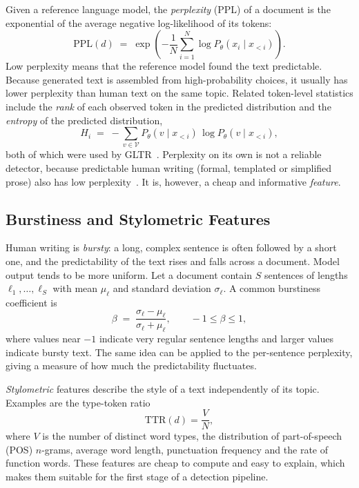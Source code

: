 Given a reference language model, the \emph{perplexity} (PPL) of a document
is the exponential of the average negative log-likelihood of its tokens:
\begin{equation}
  \mathrm{PPL}(d) \;=\; \exp\!\left(-\frac{1}{N}\sum_{i=1}^{N}
      \log P_\theta\!\left(x_i \mid x_{<i}\right)\right).
  \label{eq:perplexity}
\end{equation}
Low perplexity means that the reference model found the text predictable.
Because generated text is assembled from high-probability choices, it usually
has lower perplexity than human text on the same topic. Related token-level
statistics include the \emph{rank} of each observed token in the predicted
distribution and the \emph{entropy} of the predicted distribution,
\begin{equation}
  H_i \;=\; -\sum_{v \in \mathcal{V}} P_\theta(v \mid x_{<i})\,\log P_\theta(v \mid x_{<i}),
  \label{eq:entropy}
\end{equation}
both of which were used by GLTR~\cite{gehrmann2019gltr}. Perplexity on its own
is not a reliable detector, because predictable human writing (formal,
templated or simplified prose) also has low perplexity~\cite{liang2023biased}.
It is, however, a cheap and informative \emph{feature}.

\subsection{Burstiness and Stylometric Features}

Human writing is \emph{bursty}: a long, complex sentence is often followed by a
short one, and the predictability of the text rises and falls across a
document. Model output tends to be more uniform. Let a document contain $S$
sentences of lengths $\ell_1,\ldots,\ell_S$ with mean $\mu_\ell$ and standard
deviation $\sigma_\ell$. A common burstiness coefficient is
\begin{equation}
  \beta \;=\; \frac{\sigma_\ell - \mu_\ell}{\sigma_\ell + \mu_\ell},
  \qquad -1 \le \beta \le 1,
  \label{eq:burstiness}
\end{equation}
where values near $-1$ indicate very regular sentence lengths and larger values
indicate bursty text. The same idea can be applied to the per-sentence
perplexity, giving a measure of how much the predictability fluctuates.

\emph{Stylometric} features describe the style of a text independently of its
topic. Examples are the type-token ratio
\begin{equation}
  \mathrm{TTR}(d) = \frac{V}{N},
  \label{eq:ttr}
\end{equation}
where $V$ is the number of distinct word types, the distribution of
part-of-speech (POS) $n$-grams, average word length, punctuation frequency and
the rate of function words. These features are cheap to compute and easy to
explain, which makes them suitable for the first stage of a detection
pipeline.

